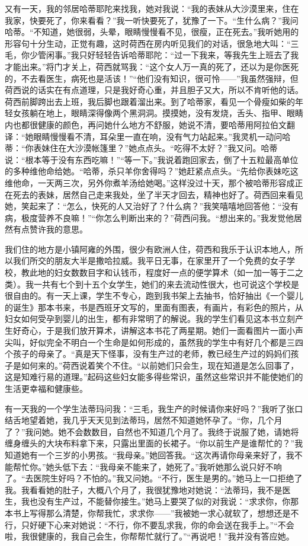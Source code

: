 \par 又有一天，我的邻居哈蒂耶陀来找我，她对我说：“我的表妹从大沙漠里来，住在我家，快要死了，你来看看？”我一听快要死了，犹豫了一下。“生什么病？”我问哈蒂。“不知道，她很弱，头晕，眼睛慢慢看不见，很瘦，正在死去。”我听她用的形容句十分生动，正觉有趣，这时荷西在房内听见我们的对话，很急地大叫：“三毛，你少管闲事。”我只好轻轻告诉哈蒂耶陀：“过一下我来，等我先生上班去了我才能出来。”将门才关上，荷西就骂我：“这个女人万一真的死了，还以为是你医死的，不去看医生，病死也是活该！”“他们没有知识，很可怜——”我虽然强辩，但荷西说的话实在有点道理，只是我好奇心重，并且胆子又大，所以不肯听他的话。荷西前脚跨出去上班，我后脚也跟着溜出来。到了哈蒂家，看见一个骨瘦如柴的年轻女孩躺在地上，眼睛深得像两个黑洞洞。摸摸她，没有发烧，舌头、指甲、眼睛内也都很健康的颜色，再问她什么地方不舒服，她说不清，要哈蒂用阿拉伯文翻译：“她眼睛慢慢看不清，耳朵里一直在响，没有气力站起来。”我灵机一动问哈蒂：“你表妹住在大沙漠帐篷里？”她点点头。“吃得不太好？”我又问。哈蒂说：“根本等于没有东西吃嘛！”“等一下。”我说着跑回家去，倒了十五粒最高单位的多种维他命给她。“哈蒂，杀只羊你舍得吗？”她赶紧点点头。“先给你表妹吃这维他命，一天两三次，另外你煮羊汤给她喝。”这样没过十天，那个被哈蒂形容成正在死去的表妹，居然自己走来我处，坐了半天才回去，精神也好了。荷西回来看见她，笑起来了：“怎么，快死的人又治好了？什么病？”我笑嘻嘻地回答他：“没有病，极度营养不良嘛！”“你怎么判断出来的？”荷西问我。“想出来的。”我发觉他居然有点赞许我的意思。
\par 我们住的地方是小镇阿雍的外围，很少有欧洲人住，荷西和我乐于认识本地人，所以我们所交的朋友大半是撒哈拉威。我平日无事，在家里开了一个免费的女子学校，教此地的妇女数数目字和认钱币，程度好一点的便学算术（如一加一等于二之类）。我一共有七个到十五个女学生，她们的来去流动性很大，也可说这个学校是很自由的。有一天上课，学生不专心，跑到我书架上去抽书，恰好抽出《一个婴儿的诞生》那本书来，书是西班牙文写的，里面有图表，有画片，有彩色的照片，从妇女如何受孕到婴儿的出生，都有非常明了的解说。我的学生们看见这本书立刻产生好奇心，于是我们放开算术，讲解这本书花了两星期。她们一面看图片一面小声尖叫，好似完全不明白一个生命是如何形成的，虽然我的学生中有好几个都是三四个孩子的母亲了。“真是天下怪事，没有生产过的老师，教已经生产过的妈妈们孩子是如何来的。”荷西说着笑个不住。“以前她们只会生，现在知道是怎么回事了，这是知难行易的道理。”起码这些妇女能多得些常识，虽然这些常识并不能使她们的生活更幸福和健康些。
\par 有一天我的一个学生法蒂玛问我：“三毛，我生产的时候请你来好吗？”我听了张口结舌地望着她，我几乎天天见到法蒂玛，居然不知道她怀孕了。“你，几个月了？”我问她。她不会数数目，自然也不知道几个月了。我终于说服了她，请她将缠身缠头的大块布料拿下来，只露出里面的长裙子。“你以前生产是谁帮忙的？”我知道她有一个三岁的小男孩。“我母亲。”她回答我。“这次再请你母亲来好了，我不能帮忙你。”她头低下去：“我母亲不能来了，她死了。”我听她那么说只好不响了。“去医院生好吗？不怕的。”我又问她。“不行，医生是男的。”她马上一口拒绝了我。我看看她的肚子，大概八个月了，我很犹豫地对她说：“法蒂玛，我不是医生，我也没有生产过，不能替你接生。”她马上要哭了似的对我说：“求求你，你那本书上写得那么清楚，你帮我忙，求求你——”我被她一求心就软了，想想还是不行，只好硬下心来对她说：“不行，你不要乱求我，你的命会送在我手上。”“不会啦，我很健康的，我自己会生，你帮帮忙就行了。”“再说吧！”我并没有答应她。
